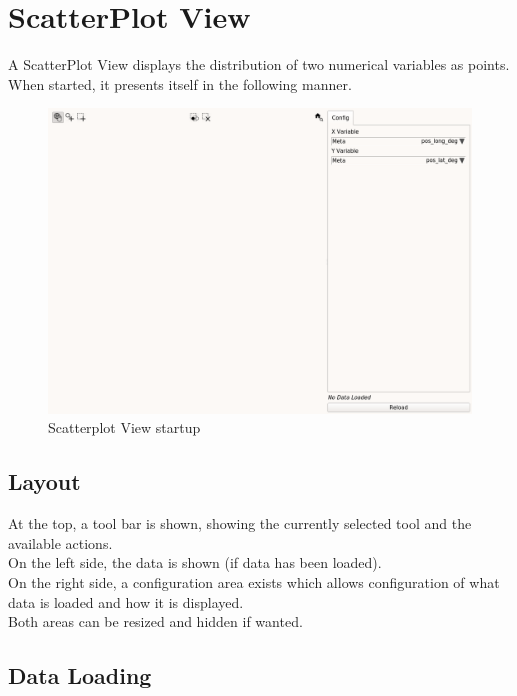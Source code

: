 \chapter{ScatterPlot View}
\label{sec:scatter_view}

A ScatterPlot View displays the distribution of two numerical variables as points. When started, it presents itself in the following manner.

\begin{figure}[H]
    \hspace*{-2cm}
    \includegraphics[width=18cm,frame]{../screenshots/scatter_start.png}
  \caption{Scatterplot View startup}
\end{figure}

\section{Layout}

At the top, a  tool bar is shown, showing the currently selected tool and the available actions. \\

On the left side, the data is shown (if data has been loaded). \\

On the right side, a configuration area exists which allows configuration of what data is loaded and how it is displayed. \\

Both areas can be resized and hidden if wanted.

\section{Data Loading}

